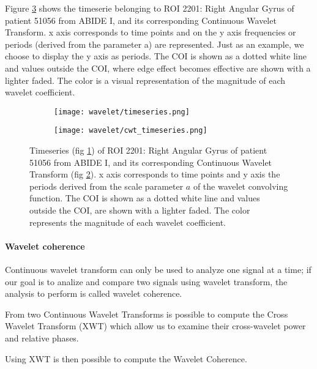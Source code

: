 \documentclass[11pt]{report}
\begin{document}
Figure \ref{fig:cwt_timeseries} shows the timeserie belonging to ROI 2201: Right Angular Gyrus of patient 51056 from ABIDE I, and its corresponding Continuous Wavelet Transform.
x axis corresponds to time points and on the y axis frequencies or periods (derived from the parameter a) are represented. Just as an example, we choose to display the y axis as periods.
The COI is shown as a dotted white line and values outside the COI, where edge effect becomes effective are shown with a lighter faded.
The color is a visual representation of the magnitude of each wavelet coefficient.

\begin{figure}
\begin{subfigure}{0.5\textwidth}
\texttt{[image: wavelet/timeseries.png]}
\caption{}
\label{fig:timeseries_cwt}
\end{subfigure}
\begin{subfigure}{0.5\textwidth}
\texttt{[image: wavelet/cwt\_timeseries.png]}
\caption{}
\label{fig:cwt}
\end{subfigure}
\caption{Timeseries (fig \ref{fig:timeseries_cwt}) of ROI 2201: Right Angular Gyrus of patient 51056 from ABIDE I, and its corresponding Continuous Wavelet Transform  (fig \ref{fig:cwt}).
x axis corresponds to time points and y axis the periods derived from the scale parameter $a$ of the wavelet convolving function.
The COI is shown as a dotted white line and values outside the COI, are shown with a lighter faded.
The color represents the magnitude of each wavelet coefficient.}
\label{fig:cwt_timeseries}
\end{figure}



\paragraph{Wavelet coherence} \hfill \newline

Continuous wavelet transform can only be used to analyze one signal at a time; if our goal is to analize and compare two signals using wavelet transform, the analysis to perform is called wavelet coherence.

From two Continuous Wavelet Transforms is possible to compute the Cross Wavelet Transform (XWT) which allow us to examine their cross-wavelet power and relative phases.

Using XWT is then possible to compute the Wavelet Coherence.
\end{document}
